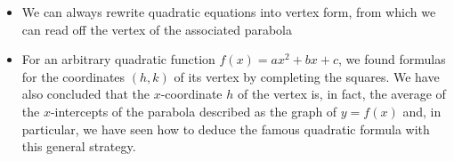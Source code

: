 \documentclass{ximera}
\begin{document}
\begin{summary}
\begin{itemize}
	\item We can always rewrite quadratic equations into vertex form, from which we can read off the vertex of the associated parabola
	\item For an arbitrary quadratic function $f(x) = ax^2+bx+c$, we found formulas for the coordinates $(h,k)$ of its vertex by completing the squares. We have also concluded that the $x$-coordinate $h$ of the vertex is, in fact, the average of the $x$-intercepts of the parabola described as the graph of $y=f(x)$ and, in particular, we have seen how to deduce the famous quadratic formula with this general strategy.
\end{itemize}
\end{summary}
\end{document}
